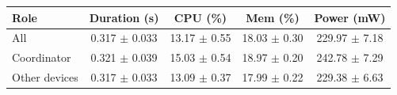 \begin{tabular}{lcccc}
\hline
\textbf{Role} & \textbf{Duration (s)} & \textbf{CPU (\%)} & \textbf{Mem (\%)} & \textbf{Power (mW)} \\
\hline
All & 0.317 $\pm$ 0.033 & 13.17 $\pm$ 0.55 & 18.03 $\pm$ 0.30 & 229.97 $\pm$ 7.18 \\
Coordinator & 0.321 $\pm$ 0.039 & 15.03 $\pm$ 0.54 & 18.97 $\pm$ 0.20 & 242.78 $\pm$ 7.29 \\
Other devices & 0.317 $\pm$ 0.033 & 13.09 $\pm$ 0.37 & 17.99 $\pm$ 0.22 & 229.38 $\pm$ 6.63 \\
\hline
\end{tabular}
